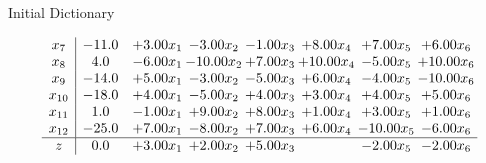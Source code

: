 \documentclass[8pt]{article}
\begin{document}
Initial Dictionary 

\[\begin{array}{c| c c@{\hskip 2pt} c@{\hskip 2pt} c@{\hskip 2pt} c@{\hskip 2pt} c@{\hskip 2pt} c@{\hskip 2pt} }
 x_{7}   &  -11.0 & +  3.00 x_{1} & -3.00 x_{2} & -1.00 x_{3} & +  8.00 x_{4} & +  7.00 x_{5} & +  6.00 x_{6}\\
 x_{8}   &  4.0 & -6.00 x_{1} & -10.00 x_{2} & +  7.00 x_{3} & + 10.00 x_{4} & -5.00 x_{5} & + 10.00 x_{6}\\
 x_{9}   &  -14.0 & +  5.00 x_{1} & -3.00 x_{2} & -5.00 x_{3} & +  6.00 x_{4} & -4.00 x_{5} & -10.00 x_{6}\\
 x_{10}   &  -18.0 & +  4.00 x_{1} & -5.00 x_{2} & +  4.00 x_{3} & +  3.00 x_{4} & +  4.00 x_{5} & +  5.00 x_{6}\\
 x_{11}   &  1.0 & -1.00 x_{1} & +  9.00 x_{2} & +  8.00 x_{3} & +  1.00 x_{4} & +  3.00 x_{5} & +  1.00 x_{6}\\
 x_{12}   &  -25.0 & +  7.00 x_{1} & -8.00 x_{2} & +  7.00 x_{3} & +  6.00 x_{4} & -10.00 x_{5} & -6.00 x_{6}\\
\hline
z    &  0.0 & +  3.00 x_{1} & +  2.00 x_{2} & +  5.00 x_{3} &   & -2.00 x_{5} & -2.00 x_{6}\\
\end{array}\]
\end{document}
